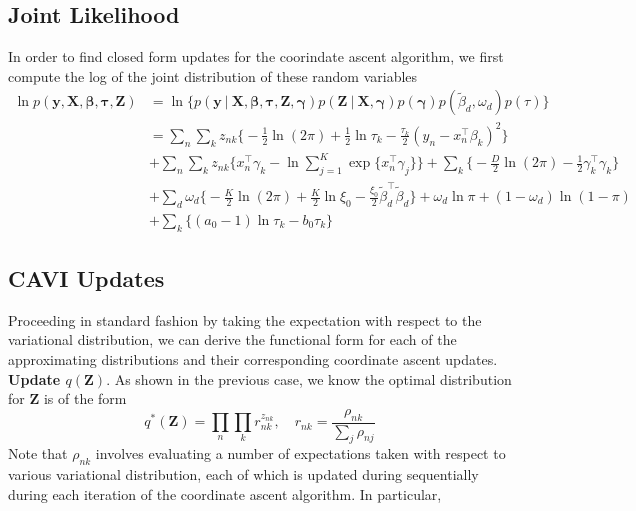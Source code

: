 \documentclass[twoside,11pt]{article}
\newcommand\given[1][]{\:#1\vert\:}
\newcommand{\transpose}[1]{#1^{\intercal}}
\newcommand{\nsum}{\sum\limits_{n}}
\newcommand{\ksum}{\sum\limits_{k}}
\newcommand{\boldbeta}{\boldsymbol\beta}
\newcommand{\boldgamma}{\boldsymbol\gamma}
\newcommand{\boldtau}{\boldsymbol\tau}
\newcommand{\sumexp}{\sum_{j=1}^{K} \exp \{ \transpose{x_n} \gamma_j \}}
\newcommand{\betad}{\tilde{\beta}_d}
\newcommand{\pr}[1]{p \left( #1 \right)}
\begin{document}
\subsection{Joint Likelihood}
In order to find closed form updates for the coorindate ascent algorithm, we first compute the log of the joint distribution of these random variables
\begin{equation} \label{eq:joint_vs}
\begin{split}
	\ln  \pr{\mathbf{y}, \mathbf{X}, \boldbeta, \boldtau, \mathbf{Z}} &= 
	\ln \bigg\{\pr{\mathbf{y} \given \mathbf{X}, \boldsymbol\beta, \boldsymbol{\tau}, \mathbf{Z}, \boldsymbol\gamma}\pr{\mathbf{Z}\given \mathbf{X}, \boldgamma}\pr{\boldgamma}\pr{\betad, \omega_d}\pr{\tau} \bigg\}\\
	&= \nsum \ksum z_{nk}\bigg\{ -\frac{1}{2}\ln(2\pi) + \frac{1}{2} \ln \tau_k - \frac{\tau_k}{2} \left( y_n - \transpose{x_n}\beta_k\right)^2 \bigg\} \\
	& + \nsum \ksum z_{nk} \bigg\{ \transpose{x_n} \gamma_k - \ln \sumexp  \bigg\} + \ksum \bigg\{ -\frac{D}{2} \ln (2\pi) - \frac{1}{2} \transpose{\gamma_k}\gamma_k \bigg\} \\
	& + \sum_{d} \omega_d \bigg\{ -\frac{K}{2} \ln(2\pi) + \frac{K}{2} \ln \xi_0 - \frac{\xi_0}{2} \transpose{\betad} \betad\bigg\} + \omega_d \ln \pi + ( 1- \omega_d) \ln(1 - \pi) \\
	& + \ksum \bigg\{ (a_0 - 1) \ln \tau_k - b_0 \tau_k \bigg\}
\end{split}
\end{equation}



\subsection{CAVI Updates}

Proceeding in standard fashion by taking the expectation with respect to the variational distribution, we can derive the functional form for each of the approximating distributions and their corresponding coordinate ascent updates. \\


\textbf{Update $q \left( \mathbf{Z} \right)$}. As shown in the previous case, we know the optimal distribution for $\mathbf{Z}$ is of the form
$$q^{*}(\mathbf{Z}) = \prod_{n} \prod_{k} r_{nk}^{z_{nk}}, \quad r_{nk} = \frac{\rho_{nk}}{\sum_{j} \rho_{nj}}$$ 
Note that $\rho_{nk}$ involves evaluating a number of expectations taken with respect to various variational distribution, each of which is updated during sequentially during each iteration of the coordinate ascent algorithm. In particular, 
\end{document}
